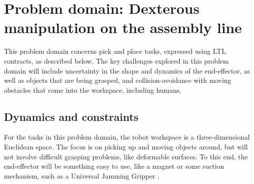 \documentclass{amsart}
\theoremstyle{definition}
\begin{document}
\section{Problem domain: Dexterous manipulation on the assembly line}\label{sec:dexterousmanip}

This problem domain concerns pick and place tasks, expressed using LTL
contracts, as described below. The key challenges explored in this problem
domain will include uncertainty in the shape and dynamics of the end-effector,
as well as objects that are being grasped, and collision-avoidance with moving
obstacles that come into the workspace, including humans.

%
%

\subsection{Dynamics and constraints}
For the tasks in this problem domain, the robot workspace is a three-dimensional
Euclidean space. The focus is on picking up and moving objects around, but will not 
involve difficult grasping problems, like deformable surfaces. To this end, the end-effector
will be something easy to use, like a magnet or some suction mechanism, such as a 
Universal Jamming Gripper \cite{AmendBRJL12}.
\end{document}
